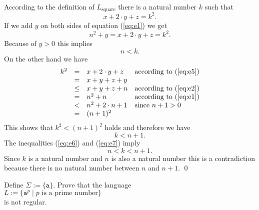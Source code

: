 According to the definition of $L_{\mathrm{square}}$ there is a natural number $k$ such that
\begin{equation}
  \label{eq:e5}
  x + 2\cdot y + z = k^2.
\end{equation}
If we add $y$ on both sides of equation (\ref{eq:e1}) we get
\[ n^2 + y = x + 2\cdot y + z = k^2. \]
Because of $y > 0$ this implies
\begin{equation}
  \label{eq:e6}
  n < k.    
\end{equation}
On the other hand we have
\[ 
\begin{array}[t]{lcll}
 k^2  & =    & x + 2 \cdot y + z       & \mbox{according to (\ref{eq:e5}})   \\
      & =    & x + y + z + y           &                                       \\
      & \leq & x + y + z + n           & \mbox{according to (\ref{eq:e2}}) \\
      & =    & n^2 + n                 & \mbox{according to (\ref{eq:e1}})   \\
      & <    & n^2 + 2 \cdot n + 1     & \mbox{since $n+1 > 0$}                   \\ 
      & =    & (n + 1)^2               
\end{array}
\]
This shows that  $k^2 < (n+1)^2$ holds and therefore we have
\begin{equation}
  \label{eq:e7}
  k < n+1.
\end{equation}
The inequalities (\ref{eq:e6}) and (\ref{eq:e7}) imply
\[ n < k < n + 1. \]
Since $k$ is a natural number and $n$ is also a natural number this is a contradiction because there is no
natural number between  $n$ and $n+1$.
\qed


\exerciseEng
Define $\Sigma := \{\mathtt{a}\}$.  
Prove that the language
\\[0.2cm]
\hspace*{1.3cm}
$L := \bigl\{ \mathtt{a}^p \mid \mbox{$p$ is a prime number} \bigr\}$
\\[0.2cm]
is not regular.  \eox
\vspace{0.3cm}

